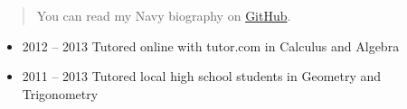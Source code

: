 \documentclass[10pt]{article}
\def\tightlist{}
\begin{document}
\begin{quote}
You can read my Navy biography on
\href{https://github.com/jhwohlgemuth/navy-biography}{GitHub}.
\end{quote}

\begin{itemize}
\tightlist
\item
  2012 -- 2013 Tutored online with tutor.com in Calculus and Algebra
\item
  2011 -- 2013 Tutored local high school students in Geometry and
  Trigonometry
\end{itemize}

\end{document}
